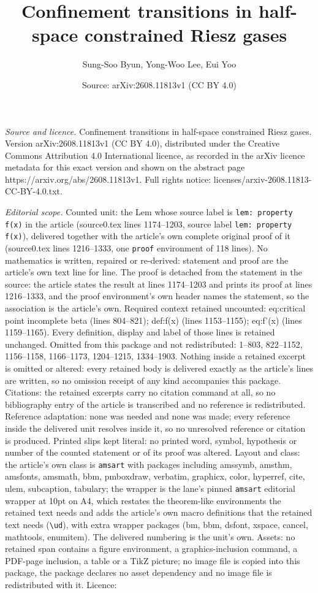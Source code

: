 \documentclass[10pt,a4paper]{amsart}
\title[Confinement transitions in half-space constrained Riesz gase]{Confinement transitions in half-space constrained Riesz gases}
\author{Sung-Soo Byun, Yong-Woo Lee, Eui Yoo}
\date{Source: arXiv:2608.11813v1 (CC BY 4.0)}
\begin{document}
\maketitle

\noindent\emph{Source and licence.} Confinement transitions in half-space constrained Riesz gases. Version arXiv:2608.11813v1 (CC BY 4.0), distributed under the Creative Commons Attribution 4.0 International licence, as recorded in the arXiv licence metadata for this exact version and shown on the abstract page https://arxiv.org/abs/2608.11813v1. Full rights notice: licenses/arxiv-2608.11813-CC-BY-4.0.txt.\par\smallskip

\noindent\textit{Editorial scope.} Counted unit: the Lem whose source label is \texttt{lem: property f(x)} in the article (source0.tex lines 1174--1203, source label \texttt{lem: property f(x)}), delivered together with the article's own complete original proof of it (source0.tex lines 1216--1333, one \texttt{proof} environment of 118 lines). No mathematics is written, repaired or re-derived: statement and proof are the article's own text line for line. The proof is detached from the statement in the source: the article states the result at lines 1174--1203 and prints its proof at lines 1216--1333, and the proof environment's own header names the statement, so the association is the article's own. Required context retained uncounted: eq:critical point incomplete beta (lines 804--821); def:f(x) (lines 1153--1155); eq:f'(x) (lines 1159--1165). Every definition, display and label of those lines is retained unchanged. Omitted from this package and not redistributed: 1--803, 822--1152, 1156--1158, 1166--1173, 1204--1215, 1334--1903. Nothing inside a retained excerpt is omitted or altered: every retained body is delivered exactly as the article's lines are written, so no omission receipt of any kind accompanies this package. Citations: the retained excerpts carry no citation command at all, so no bibliography entry of the article is transcribed and no reference is redistributed. Reference adaptation: none was needed and none was made; every reference inside the delivered unit resolves inside it, so no unresolved reference or citation is produced. Printed slips kept literal: no printed word, symbol, hypothesis or number of the counted statement or of its proof was altered. Layout and class: the article's own class is \texttt{amsart} with packages including amssymb, amsthm, amsfonts, amsmath, bbm, pmboxdraw, verbatim, graphicx, color, hyperref, cite, ulem, subcaption, tabulary; the wrapper is the lane's pinned \texttt{amsart} editorial wrapper at 10pt on A4, which restates the theorem-like environments the retained text needs and adds the article's own macro definitions that the retained text needs (\texttt{\textbackslash ud}), with extra wrapper packages (bm, bbm, dsfont, xspace, cancel, mathtools, enumitem). The delivered numbering is the unit's own. Assets: no retained span contains a figure environment, a graphics-inclusion command, a PDF-page inclusion, a table or a TikZ picture; no image file is copied into this package, the package declares no asset dependency and no image file is redistributed with it. Licence: 
\end{document}
